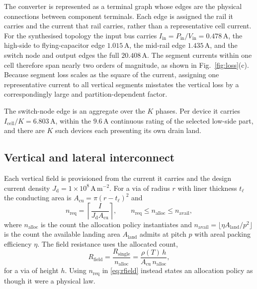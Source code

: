 \documentclass[journal]{IEEEtran}
\begin{document}
The converter is represented as a terminal graph whose edges are the physical connections
between component terminals. Each edge is assigned the rail it carries and the current that
rail carries, rather than a representative cell current. For the synthesised topology the
input bus carries $I_{\mathrm{in}} = P_{\mathrm{in}}/V_{\mathrm{in}} = 0.478$\,A, the
high-side to flying-capacitor edge $1.015$\,A, the mid-rail edge $1.435$\,A, and the switch
node and output edges the full $20.408$\,A. The segment currents within one cell therefore
span nearly two orders of magnitude, as shown in Fig.~\ref{fig:loss}(c). Because segment loss
scales as the square of the current, assigning one representative current to all vertical
segments misstates the vertical loss by a correspondingly large and partition-dependent
factor.

The switch-node edge is an aggregate over the $K$ phases. Per device it carries
$I_{\mathrm{cell}}/K = 6.803$\,A, within the $9.6$\,A continuous rating of the selected
low-side part, and there are $K$ such devices each presenting its own drain land.

\subsection{Vertical and lateral interconnect}
Each vertical field is provisioned from the current it carries and the design current
density $J_{\mathrm{d}} = 1\times10^{8}$\,A\,m$^{-2}$. For a via of radius $r$ with liner
thickness $t_{\ell}$ the conducting area is
$A_{\mathrm{cu}} = \pi(r-t_{\ell})^{2}$ and
\begin{equation}
n_{\mathrm{req}} = \left\lceil \frac{I}{J_{\mathrm{d}} A_{\mathrm{cu}}} \right\rceil, \qquad
n_{\mathrm{req}} \le n_{\mathrm{alloc}} \le n_{\mathrm{avail}},
\label{eq:nreq}
\end{equation}
where $n_{\mathrm{alloc}}$ is the count the allocation policy instantiates and
$n_{\mathrm{avail}} = \lfloor \eta A_{\mathrm{land}}/p^{2}\rfloor$ is the count the available
landing area $A_{\mathrm{land}}$ admits at pitch $p$ with areal packing efficiency $\eta$.
The field resistance uses the allocated count,
\begin{equation}
R_{\mathrm{field}} = \frac{R_{\mathrm{single}}}{n_{\mathrm{alloc}}}
 = \frac{\rho(T)\,h}{A_{\mathrm{cu}}\, n_{\mathrm{alloc}}},
\label{eq:rfield}
\end{equation}
for a via of height $h$. Using $n_{\mathrm{req}}$ in \eqref{eq:rfield} instead states an
allocation policy as though it were a physical law.
\end{document}
